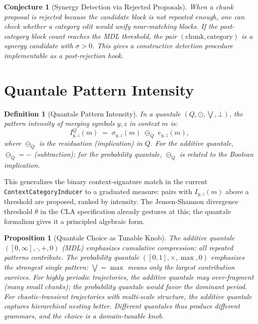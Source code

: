 \documentclass[11pt]{article}
\newtheorem{proposition}{Proposition}
\newtheorem{definition}{Definition}
\newtheorem{conjecture}{Conjecture}
\begin{document}
\begin{conjecture}[Synergy Detection via Rejected Proposals]
\label{conj:synergy-detect}
When a chunk proposal is rejected because the candidate block is not repeated enough, one can check whether a category edit would unify near-matching blocks. If the post-category block count reaches the MDL threshold, the pair $(\text{chunk}, \text{category})$ is
 a synergy candidate with $\sigma > 0$. This gives a constructive detection procedure implementable as a post-rejection hook.
\end{conjecture}

\section{Quantale Pattern Intensity}

\begin{definition}[Quantale Pattern Intensity]
\label{def:quantale-intensity}
In a quantale $(Q, \odot, \bigvee, \bot)$, the pattern intensity of merging symbols $y, z$ in context $m$ is:
\[
I_{y,z}^{Q}(m) \;=\; \sigma_{y,z}(m) \;\ominus_Q\; e_{y,z}(m),
\]
where $\ominus_Q$ is the residuation (implication) in $Q$. For the additive quantale, $\ominus_Q = -$ (subtraction); for the probability quantale, $\ominus_Q$ is related to the Boolean implication.
\end{definition}

This generalizes the binary context-signature match in the current \texttt{ContextCategoryInducer} to a graduated measure: pairs with $I_{y,z}(m)$ above a threshold are proposed, ranked by intensity. The Jensen-Shannon divergence threshold $\theta$ in the CLA specification already gestures at this; the quantale formalism gives it a principled algebraic form.

\begin{proposition}[Quantale Choice as Tunable Knob]
\label{prop:quantale-knob}
The additive quantale $([0,\infty], \cdot, +, 0)$ (MDL) emphasizes cumulative compression: all repeated patterns contribute. The probability quantale $([0,1], \times, \max, 0)$ emphasizes the strongest single pattern: $\bigvee = \max$ means only the largest contribution survives. For highly periodic trajectories, the additive quantale may over-fragment (many small chunks); the probability quantale would favor the dominant period. For chaotic-transient trajectories with multi-scale structure, the additive quantale captures hierarchical nesting better. Different quantales thus produce different grammars, and the choice is a domain-tunable knob.
\end{proposition}
\end{document}
